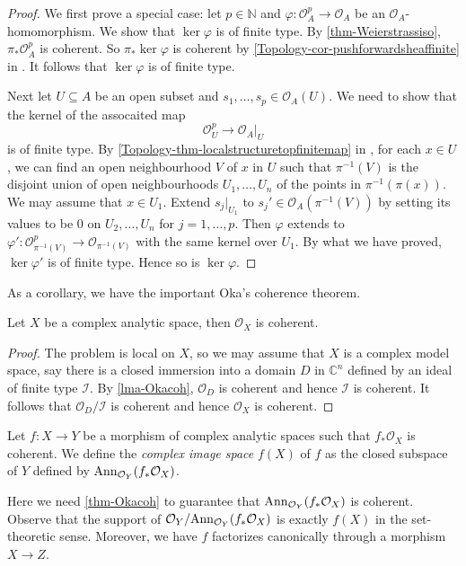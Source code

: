 \begin{proof}
    We first prove a special case: let $p\in \mathbb{N}$ and $\varphi:\mathcal{O}_A^p\rightarrow \mathcal{O}_A$ be an $\mathcal{O}_A$-homomorphism. We show that $\ker \varphi$ is of finite type. By  \cref{thm-Weierstrassiso}, $\pi_*\mathcal{O}_A^p$ is coherent. So $\pi_*\ker \varphi$ is coherent by \cref{Topology-cor-pushforwardsheaffinite} in . It follows that $\ker \varphi$ is of finite type.

    Next let $U\subseteq A$ be an open subset and $s_1,\ldots,s_p\in \mathcal{O}_A(U)$. We need to show that the kernel of the assocaited map
    \[
        \mathcal{O}_U^p\rightarrow \mathcal{O}_A|_U
    \]
    is of finite type. By \cref{Topology-thm-localstructuretopfinitemap} in , for each $x\in U$, we can find an open neighbourhood $V$ of $x$ in $U$ such that $\pi^{-1}(V)$ is the disjoint union of open neighbourhoods $U_1,\ldots,U_n$ of the points in $\pi^{-1}(\pi(x))$. We may assume that $x\in U_1$. Extend $s_j|_{U_1}$ to $s_j'\in \mathcal{O}_A(\pi^{-1}(V))$ by setting its values to be $0$ on $U_2,\ldots,U_n$ for $j=1,\ldots,p$. Then $\varphi$ extends to $\varphi':\mathcal{O}_{\pi^{-1}(V)}^p\rightarrow \mathcal{O}_{\pi^{-1}(V)}$ with the same kernel over $U_1$. By what we have proved, $\ker \varphi'$ is of finite type. Hence so is $\ker \varphi$.
\end{proof}
As a corollary, we have the important Oka's coherence theorem.
\begin{thm}\label{thm-Okacoh}
    Let $X$ be a complex analytic space, then $\mathcal{O}_X$ is coherent.
\end{thm}
\begin{proof}
    The problem is local on $X$, so we may assume that $X$ is a complex model space, say there is a closed immersion into a domain $D$ in $\mathbb{C}^n$ defined by an ideal of finite type $\mathcal{I}$. By \cref{lma-Okacoh}, $\mathcal{O}_D$ is coherent and hence $\mathcal{I}$ is coherent. It follows that $\mathcal{O}_D/\mathcal{I}$ is coherent and hence $\mathcal{O}_X$ is coherent.
\end{proof}

\begin{definition}
    Let $f:X\rightarrow Y$ be a morphism of complex analytic spaces such that $f_*\mathcal{O}_X$ is coherent. We define the \emph{complex image space} $f(X)$ of $f$ as the closed subspace of $Y$ defined by $\mathrm{Ann}_{\mathcal{O}_Y}(f_*\mathcal{O}_X)$.
\end{definition}
Here we need \cref{thm-Okacoh} to guarantee that $\mathrm{Ann}_{\mathcal{O}_Y}(f_*\mathcal{O}_X)$ is coherent. Observe that the support of $\mathcal{O}_Y/\mathrm{Ann}_{\mathcal{O}_Y}(f_*\mathcal{O}_X)$ is exactly $f(X)$ in the set-theoretic sense. Moreover, we have $f$ factorizes canonically through a morphism $X\rightarrow Z$.

